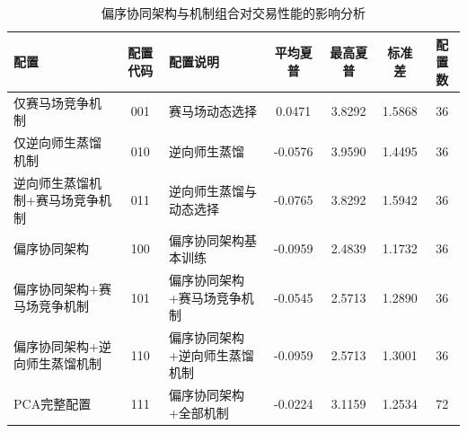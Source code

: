 \begin{table}[H]
\centering
\caption{偏序协同架构与机制组合对交易性能的影响分析}
\label{tab:tradeperformanceanalysis}
\footnotesize
\setlength{\tabcolsep}{3pt}
\renewcommand{\arraystretch}{1.18}
\begin{tabular}{p{2.8cm}cp{3.1cm}cccc}
\toprule
\textbf{配置} & \textbf{配置代码} & \textbf{配置说明} & \textbf{平均夏普} & \textbf{最高夏普} & \textbf{标准差} & \textbf{配置数} \\
\midrule
仅赛马场竞争机制 & 001 & 赛马场动态选择 & 0.0471 & 3.8292 & 1.5868 & 36 \\
仅逆向师生蒸馏机制 & 010 & 逆向师生蒸馏 & -0.0576 & 3.9590 & 1.4495 & 36 \\
逆向师生蒸馏机制+赛马场竞争机制 & 011 & 逆向师生蒸馏与动态选择 & -0.0765 & 3.8292 & 1.5942 & 36 \\
偏序协同架构 & 100 & 偏序协同架构基本训练 & -0.0959 & 2.4839 & 1.1732 & 36 \\
偏序协同架构+赛马场竞争机制 & 101 & 偏序协同架构+赛马场竞争机制 & -0.0545 & 2.5713 & 1.2890 & 36 \\
偏序协同架构+逆向师生蒸馏机制 & 110 & 偏序协同架构+逆向师生蒸馏机制 & -0.0959 & 2.5713 & 1.3001 & 36 \\
PCA完整配置 & 111 & 偏序协同架构+全部机制 & -0.0224 & 3.1159 & 1.2534 & 72 \\
\bottomrule
\end{tabular}
\end{table}
